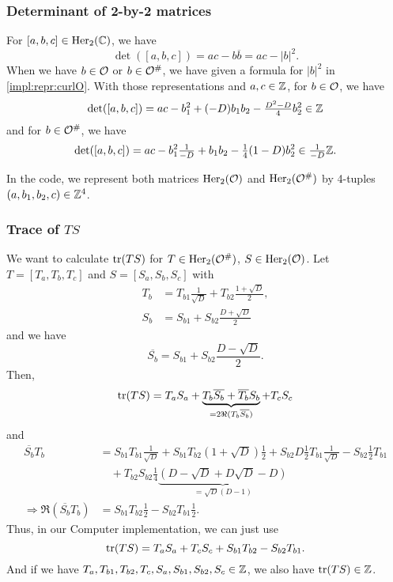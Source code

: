 \subsubsection{Determinant of 2-by-2 matrices}
\label{detCurlO}
For $[a,b,c] \in \operatorname{Her}_2(\mathbb{C})$, we have
\[ \det([a,b,c]) = ac - b \overline{b} = ac - |b|^2 . \]
%
When we have $b \in \mathcal{O}$ or $b \in \mathcal{O}^\#$, we have given a formula for $|b|^2$ in \cref{impl:repr:curlO}. With those representations and $a,c \in \mathbb{Z}$, for $b \in \mathcal{O}$, we have
\[ \det([a,b,c]) = a c -  b_1^2 + (-D) b_1 b_2 - \tfrac{D^2-D}{4} b_2^2 \in \mathbb{Z} \]
and for $b \in \mathcal{O}^\#$, we have
\[ \det([a,b,c]) = a c - b_1^2 \tfrac{1}{-D} + b_1 b_2 - \tfrac{1}{4} (1-D) b_2^2 \in \tfrac{1}{-D} \mathbb{Z} . \]

In the code, we represent both matrices $\operatorname{Her}_2(\mathcal{O})$ and $\operatorname{Her}_2(\mathcal{O}^\#)$ by 4-tuples $(a,b_1,b_2,c) \in \mathbb{Z}^4$.

\subsubsection{Trace of $TS$}
We want to calculate $\textup{\textrm{tr}}(TS)$ for $T \in \operatorname{Her}_2(\mathcal{O}^\#)$, $S \in \operatorname{Her}_2(\mathcal{O})$.
Let $T = [T_a, T_b, T_c]$ and $S = [S_a, S_b, S_c]$ with
\begin{align*}
T_b &= T_{b1} \frac{1}{\sqrt{D}} + T_{b2} \frac{1 + \sqrt{D}} {2} , \\
S_b &= S_{b1} + S_{b2} \frac{D + \sqrt{D}} {2}
\end{align*}
and we have
\[ \overline{S_b} = S_{b1} + S_{b2} \frac{D - \sqrt{D}} {2} . \]
Then,
\[
\textup{\textrm{tr}}(T S) = T_a S_a
+ \underbrace{T_b \overline{S_b} + \overline{T_b} S_b}_{= 2 \Re(T_b \overline{S_b})}
+ T_c S_c
\]
and
\begin{align*}
\overline{S_b} T_b &= S_{b1} T_{b1} \tfrac{1}{\sqrt{D}} + S_{b1} T_{b2} (1 + \sqrt{D}) \tfrac{1}{2}
+ S_{b2} D \tfrac{1}{2} T_{b1} \tfrac{1}{\sqrt{D}}
- S_{b2} \tfrac{1}{2} T_{b1} \\
&\quad + T_{b2} S_{b2} \tfrac{1}{4} \underbrace{(D - \sqrt{D} + D \sqrt{D} - D)}_{=\sqrt{D}(D-1)} \\
\Rightarrow \Re(\overline{S_b} T_b) &= S_{b1} T_{b2} \tfrac{1}{2} - S_{b2} T_{b1} \tfrac{1}{2} .
\end{align*}
Thus, in our Computer implementation, we can just use
\[ \textup{\textrm{tr}}(T S) = T_a S_a + T_c S_c + S_{b1} T_{b2} - S_{b2} T_{b1} . \]
And if we have $T_a, T_{b1}, T_{b2}, T_{c}, S_a, S_{b1}, S_{b2}, S_c \in \mathbb{Z}$, we also have $\textup{\textrm{tr}}(TS) \in \mathbb{Z}$.


